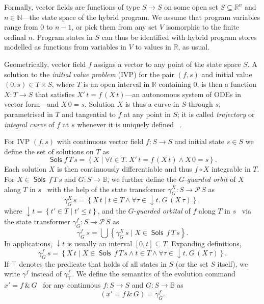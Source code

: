 \documentclass[envcountsame]{llncs}
\newcommand{\Pow}{\mathcal{P}}
\newcommand{\reals}{\mathbb{R}}
\newcommand{\bools}{\mathbb{B}}
\newcommand{\Sols}{\mathop{\mathsf{Sols}}}
\newcommand\notein[3]{\todo[inline,linecolor=orange!80!black,backgroundcolor=#2!20]{#1: #3}%
}
\newcommand{\sfin}[1]{\notein{{\bf SF}}{scolor}{#1}}
\begin{document}
\sfin{Need to integrate this with what follows}

Formally, vector fields are functions of type $S\to S$ on some open set
$S\subseteq \reals^n$ and $n\in\mathbb{N}$---the state space of
the hybrid program. We assume that program variables range from $0$ to
$n-1$, or pick them from any set $V$ isomorphic to the finite ordinal
$n$. Program states in $S$ can thus be identified with hybrid program
stores modelled as functions from variables in $V$ to values in
$\reals$, as usual.

Geometrically, vector field $f$ assigns a vector to any point of the
state space
$S$. A solution to the \emph{initial value problem} (IVP) for the pair
$(f,s)$ and initial value $(0,s)\in T\times S$, where $T$ is an open
interval in $\reals$ containing $0$, is then a function $X:T\to S$
that satisfies $X'\, t = f\, (X\, t)$---an autonomous system of ODEs
in vector form---and $X\, 0 = s$. Solution
$X$ is thus a curve in $S$ through $s$, parametrised in $T$ and
tangential to $f$ at any point in $S$; it is called \emph{trajectory}
or \emph{integral curve} of $f$ at $s$ whenever it is uniquely
defined ~\cite{Teschl12}.

For IVP $(f,s)$ with continuous vector field $f:S\to S$ and initial
state $s\in S$ we define the set of solutions on
$T$ as
\begin{equation*}
\Sols f\, T\, s = \left\{X \mid \forall t\in T.\  X'\, t = f\, (X\, t)\land X\, 0 = s\right\}.
\end{equation*}
Each solution $X$ is then continuously differentiable and thus
$f\circ X$ integrable in $T$.  For $X\in \Sols\, f\, T\, s$ and
$G:S\to\bools$, we further define the $G$-\emph{guarded orbit} of $X$
along $T$ in $s$~\cite{MuniveS19} with the help of the state transformer
$\gamma^X_G:S\to \Pow\, S$ as 
\begin{equation*}
\gamma^X_{G}\, s= \left\{X\, t\mid t\in T\land \forall \tau\in
{\downarrow}t.\ G\, (X\, \tau)\right\},
\end{equation*}
where ${\downarrow}t = \left\{t'\in T\mid t'\le t\right\}$, and the
$G$-\emph{guarded orbital} of $f$ along $T$ in $s$~\cite{MuniveS19}
via the state transformer $\gamma^f_G:S\to \Pow\, S$ as
\begin{equation*}
  \gamma^f_G\ s = \bigcup\left\{\gamma^X_G\, s\mid X\in \Sols\, f\, T\, s\right\}.
\end{equation*}
In applications, ${\downarrow}t$ is usually an interval
$[0,t]\subseteq T$.  Expanding definitions,
\begin{equation*}
\gamma^f_G\, s = \left\{X\, t \mid X\in \Sols\, f\, T\, s \land t\in T
\land \forall \tau\in{\downarrow}t.\ G\, (X\, \tau)\right\}.
\end{equation*}
If $\top$ denotes the predicate that holds of all states in $S$ (or
the set $S$ itself), we write $\gamma^f$ instead of
$\gamma^f_\top$. We define the semantics of the evolution command
$x'= f\, \&\, G$~\cite{MuniveS19} for any continuous $f:S\to S$ and
$G:S\to \bools$ as
\begin{equation}
{\left(x'= f\, \&\, G\right)} = \gamma^f_G.\label{eq:st-evl}\tag{st-evl}
\end{equation}
\end{document}
